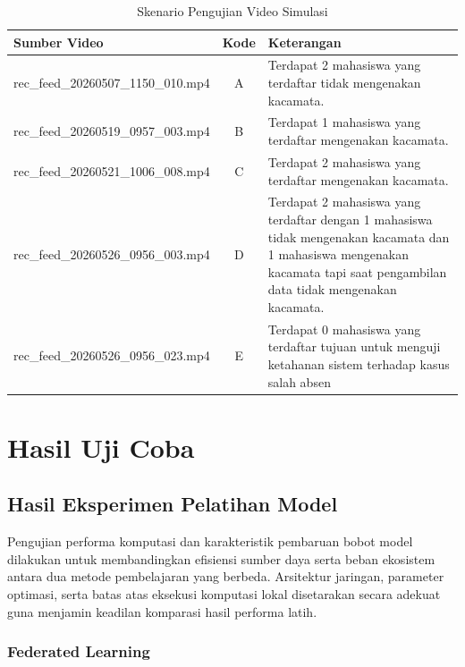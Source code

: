 \begin{table}[H]
  \centering
  \caption{Skenario Pengujian Video Simulasi}
  \label{tab:skenario-video}
  \begin{tabular}{|l|c|p{8.5cm}|}
    \hline
    \textbf{Sumber Video} & \textbf{Kode} & \textbf{Keterangan} \\
    \hline
    rec\_feed\_20260507\_1150\_010.mp4 & A & Terdapat 2 mahasiswa yang terdaftar tidak mengenakan kacamata. \\
    rec\_feed\_20260519\_0957\_003.mp4 & B & Terdapat 1 mahasiswa yang terdaftar mengenakan kacamata. \\
    rec\_feed\_20260521\_1006\_008.mp4 & C & Terdapat 2 mahasiswa yang terdaftar mengenakan kacamata. \\
    rec\_feed\_20260526\_0956\_003.mp4 & D & Terdapat 2 mahasiswa yang terdaftar dengan 1 mahasiswa tidak mengenakan kacamata dan 1 mahasiswa mengenakan kacamata tapi saat pengambilan data tidak mengenakan kacamata. \\
    rec\_feed\_20260526\_0956\_023.mp4 & E & Terdapat 0 mahasiswa yang terdaftar tujuan untuk menguji ketahanan sistem terhadap kasus salah absen \\
    \hline
  \end{tabular}
\end{table}



\section{Hasil Uji Coba}
\label{sec:hasil-uji-coba}

\subsection{Hasil Eksperimen Pelatihan Model}
\label{subsec:hasil-eksperimen-pelatihan}

Pengujian performa komputasi dan karakteristik pembaruan bobot model dilakukan untuk membandingkan efisiensi sumber daya serta beban ekosistem antara dua metode pembelajaran yang berbeda. Arsitektur jaringan, parameter optimasi, serta batas atas eksekusi komputasi lokal disetarakan secara adekuat guna menjamin keadilan komparasi hasil performa latih.

\subsubsection{Federated Learning}

